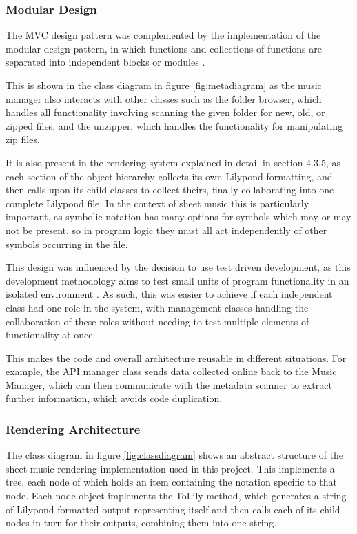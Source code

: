 \subsubsection{Modular Design}
The MVC design pattern was complemented by the implementation of the  modular design pattern, in which functions and collections of functions are separated into independent blocks or modules \parencite{modular}.

This is shown in the class diagram in figure \ref{fig:metadiagram} as the music manager also interacts with other classes such as the folder browser, which handles all functionality involving scanning the given folder for new, old, or zipped files, and the unzipper, which handles the functionality for manipulating zip files.

It is also present in the rendering system explained in detail in section 4.3.5, as each section of the object hierarchy collects its own Lilypond formatting, and then calls upon its child classes to collect theirs, finally collaborating into one complete Lilypond file. In the context of sheet music this is particularly important, as symbolic notation has many options for symbols which may or may not be present, so in program logic they must all act independently of other symbols occurring in the file.

This design was influenced by the decision to use test driven development, as this development methodology aims to test small units of program functionality in an isolated environment \parencite{TDD}.
 As such, this was easier to achieve if each independent class had one role in the system, with management classes handling the collaboration of these roles without needing to test multiple elements of functionality at once. 

This makes the code and overall architecture reusable in different situations. For example, the API manager class sends data collected online back to the Music Manager, which can then communicate with the metadata scanner to extract further information, which avoids code duplication.

\subsubsection{Rendering Architecture}
The class diagram in figure \ref{fig:classdiagram} shows an abstract structure of the sheet music rendering implementation used in this project. This implements a tree, each node of which holds an item containing the notation specific to that node. Each node object implements the ToLily method, which generates a string of Lilypond formatted output representing itself and then calls each of its child nodes in turn for their outputs, combining them into one string. 

